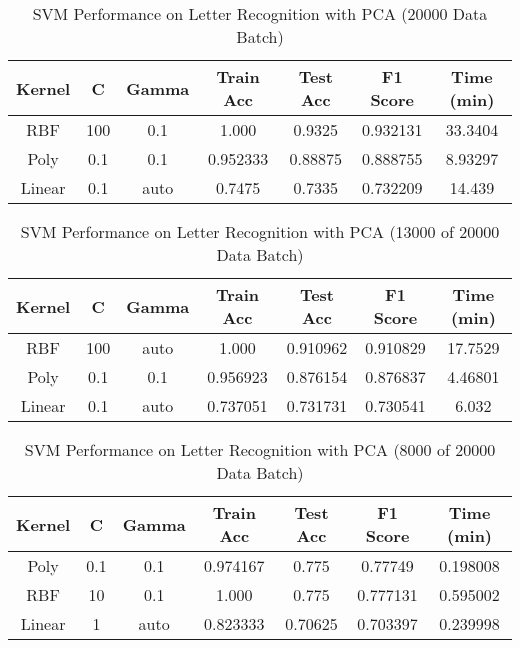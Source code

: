 \documentclass[conference]{IEEEtran}
\begin{document}
\begin{table}[H]
\centering
\caption{SVM Performance on Letter Recognition with PCA (20000 Data Batch)}

\begin{tabular}{|c|c|c|c|c|c|c|}
\hline
Kernel & C & Gamma & Train Acc & Test Acc & F1 Score & Time (min) \\ \hline
RBF & 100 & 0.1 & 1.000 & 0.9325 & 0.932131 & 33.3404 \\ \hline
Poly & 0.1 & 0.1 & 0.952333 & 0.88875 & 0.888755 & 8.93297 \\ \hline
Linear & 0.1 & auto & 0.7475 & 0.7335 & 0.732209 & 14.439 \\ \hline
\end{tabular}
\end{table}


\begin{table}[H]
\centering
\caption{SVM Performance on Letter Recognition with PCA (13000 of 20000 Data Batch)}

\begin{tabular}{|c|c|c|c|c|c|c|}
\hline
Kernel & C & Gamma & Train Acc & Test Acc & F1 Score & Time (min) \\ \hline
RBF & 100 & auto & 1.000 & 0.910962 & 0.910829 & 17.7529 \\ \hline
Poly & 0.1 & 0.1 & 0.956923 & 0.876154 & 0.876837 & 4.46801 \\ \hline
Linear & 0.1 & auto & 0.737051 & 0.731731 & 0.730541 & 6.032 \\ \hline
\end{tabular}
\end{table}


\begin{table}[H]
\centering
\caption{SVM Performance on Letter Recognition with PCA (8000 of 20000 Data Batch)}

\begin{tabular}{|c|c|c|c|c|c|c|}
\hline
Kernel & C & Gamma & Train Acc & Test Acc & F1 Score & Time (min) \\ \hline
Poly & 0.1 & 0.1 & 0.974167 & 0.775 & 0.77749 & 0.198008 \\ \hline
RBF & 10 & 0.1 & 1.000 & 0.775 & 0.777131 & 0.595002 \\ \hline
Linear & 1 & auto & 0.823333 & 0.70625 & 0.703397 & 0.239998 \\ \hline

\end{tabular}
\end{table}
\end{document}
